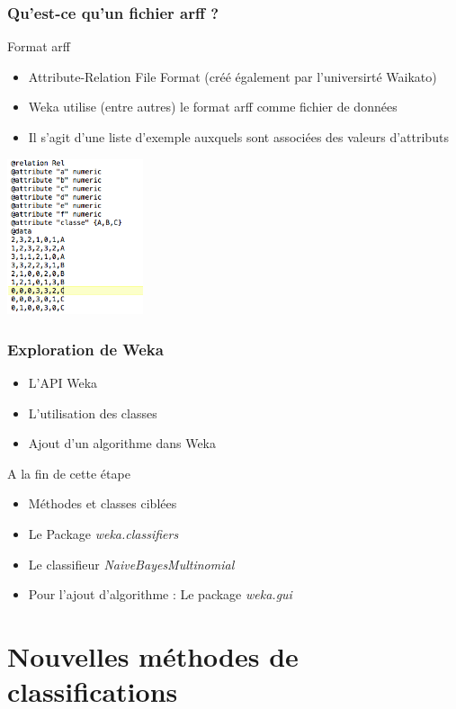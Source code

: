 \documentclass[12pt]{beamer}
\begin{document}
\begin{frame}
\frametitle{Qu'est-ce qu'un fichier arff ?}
\begin{block}{Format arff}
\begin{itemize}
\item Attribute-Relation File Format (créé également par l'universirté Waikato)
\item Weka utilise (entre autres) le format arff comme fichier de données
\item Il s'agit d’une liste d’exemple auxquels sont associées des valeurs d’attributs
\end{itemize}
\end{block}
\begin{center}
\includegraphics[width=0.3\textwidth]{arff}
\end{center}
\end{frame}



\begin{frame}
\frametitle{Exploration de Weka}
\begin{itemize}
\item L'API Weka
\item L'utilisation des classes
\item Ajout d'un algorithme dans Weka
\end{itemize}
\begin{block}{A la fin de cette étape}
\begin{itemize}
\item Méthodes et classes ciblées
\item Le Package \textit{weka.classifiers}
\item Le classifieur \textit{NaiveBayesMultinomial}
\item Pour l'ajout d'algorithme : Le package \textit{weka.gui}
\end{itemize}
\end{block}
\end{frame}

\section{Nouvelles méthodes de classifications}
\end{document}
